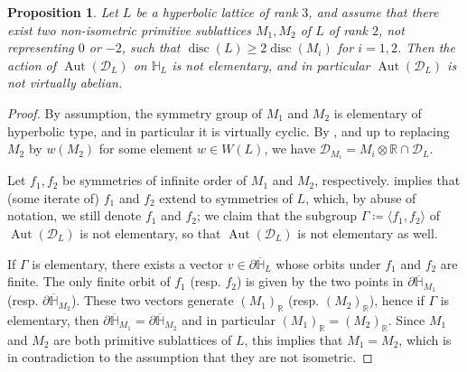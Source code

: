 \documentclass[11pt,letterpaper]{amsart}
\DeclareMathOperator{\Aut}{Aut}
\DeclareMathOperator{\disc}{disc}
\newcommand{\RR}{\mathbb{R}}
\newcommand{\D}{\mathcal{D}}
\newtheorem{proposition}[theorem]{Proposition}
\theoremstyle{definition}
\theoremstyle{remark}
\begin{document}
\begin{proposition}\label{prop:rank2sublattice}
Let $L$ be a hyperbolic lattice of rank $3$, and assume that there exist two \emph{non-isometric} primitive sublattices $M_1,M_2$ of $L$ of rank $2$, not representing $0$ or $-2$, such that $\disc(L)\ge 2\disc(M_i)$ for $i=1,2$. Then the action of $\Aut(\mathcal{D}_L)$ on $\mathbb{H}_L$ is not elementary, and in particular $\Aut(\mathcal{D}_L)$ is not virtually abelian.
\end{proposition}
\begin{proof}
By assumption, the symmetry group of $M_1$ and $M_2$ is elementary of hyperbolic type, and in particular it is virtually cyclic. By , and up to replacing $M_2$ by $w(M_2)$ for some element $w \in W(L)$, we have $\D_{M_i} = M_i \otimes \RR \cap \D_{L}$.

Let $f_1,f_2$ be symmetries of infinite order of $M_1$ and $M_2$, respectively.  implies that (some iterate of) $f_1$ and $f_2$ extend to symmetries of $L$, which, by abuse of notation, we still denote $f_1$ and $f_2$; we claim that the subgroup $\Gamma \coloneqq \langle f_1,f_2\rangle$ of $\Aut(\mathcal{D}_L)$ is not elementary, so that $\Aut(\mathcal{D}_L)$ is not elementary as well.

If $\Gamma$ is elementary, there exists a vector $v\in \partial \overline{\mathbb{H}}_L$ whose orbits under $f_1$ and $f_2$ are finite. The only finite orbit of $f_1$ (resp. $f_2$) is given by the two points in $\partial \overline{\mathbb{H}}_{M_1}$ (resp. $\partial \overline{\mathbb{H}}_{M_2}$). These two vectors generate $(M_1)_\RR$ (resp. $(M_2)_\RR$), hence if $\Gamma$ is elementary, then $\partial \overline{\mathbb{H}}_{M_1} = \partial \overline{\mathbb{H}}_{M_2}$ and in particular $(M_1)_\RR = (M_2)_\RR$. Since $M_1$ and $M_2$ are both primitive sublattices of $L$, this implies that $M_1 = M_2$, which is in contradiction to the assumption that they are not isometric.
\end{proof}
\end{document}
